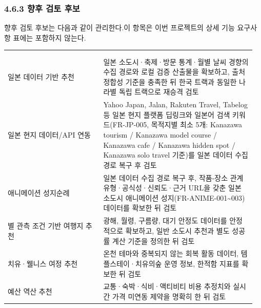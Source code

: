 \documentclass[12pt,a4paper]{article}
\makeatletter
\newcommand{\DocNeedspace}[1]{\par\ifdim\dimexpr\pagegoal-\pagetotal\relax<#1\newpage\fi}
\renewcommand{\arraystretch}{1.35}
\newcommand{\DocTableContinue}[2]{\multicolumn{#1}{@{}l@{}}{\footnotesize\textbf{#2 (계속)}} \\}
\makeatother
\begin{document}
\newpage
\DocNeedspace{5\baselineskip}
\subsubsection*{4.6.3 향후 검토 후보}


\DocNeedspace{3\baselineskip}
향후 검토 후보는 다음과 같이 관리한다.\newline 이 항목은 이번 프로젝트의 상세 기능 요구사항 표에는 포함하지 않는다.


\DocNeedspace{18\baselineskip}
\begin{small}
\setlength{\tabcolsep}{3pt}
\setlength{\extrarowheight}{1pt}
\renewcommand{\arraystretch}{1.42}
\begin{longtable}{@{}>{\centering\arraybackslash}m{0.370\linewidth}>{\RaggedRight\arraybackslash}m{0.594\linewidth}@{}}
\toprule
\multicolumn{1}{>{\centering\arraybackslash}m{0.370\linewidth}}{\textbf{후보}} & \multicolumn{1}{>{\centering\arraybackslash}m{0.594\linewidth}}{\textbf{검토 조건}} \\
\midrule
\endfirsthead
\toprule
\DocTableContinue{2}{4.6.3 향후 검토 후보}
\midrule
\multicolumn{1}{>{\centering\arraybackslash}m{0.370\linewidth}}{\textbf{후보}} & \multicolumn{1}{>{\centering\arraybackslash}m{0.594\linewidth}}{\textbf{검토 조건}} \\
\midrule
\endhead
일본 데이터 기반 추천 & 일본 소도시·축제·방문 통계·월별 날씨 경향의 수집 경로와 로컬 검증 산출물을 확보하고, 출처 정합성 기준을 충족한 뒤 한국 트랙과 동일한 나라별 독립 트랙으로 재승격 검토 \\
일본 현지 데이터/API 연동 & Yahoo Japan, Jalan, Rakuten Travel, Tabelog 등 일본 현지 플랫폼 딥링크와 일본어 검색 키워드(FR-JP-005, 목적지별 최소 5개: Kanazawa tourism / Kanazawa model course / Kanazawa cafe / Kanazawa hidden spot / Kanazawa solo travel 기준)를 일본 데이터 수집 경로 복구 후 검토 \\
애니메이션 성지순례 & 일본 데이터 수집 경로 복구 후, 작품-장소 관계 유형·공식성·신뢰도·근거 URL을 갖춘 일본 소도시 애니메이션 성지(FR-ANIME-001\textasciitilde{}003) 데이터를 확보한 뒤 검토 \\
별 관측 조건 기반 여행지 추천 & 광해, 월령, 구름량, 대기 안정도 데이터를 안정적으로 확보하고, 일반 소도시 추천과 별도 성공률 계산 기준을 정의한 뒤 검토 \\
치유·웰니스 여정 추천 & 온천 테마와 중복되지 않는 회복 활동 데이터, 템플스테이·치유의숲 운영 정보, 한적함 지표를 확보한 뒤 검토 \\
예산 역산 추천 & 교통·숙박·식비·액티비티 비용 추정치와 실시간 가격 미연동 제약을 명확히 한 뒤 검토 \\
\bottomrule
\end{longtable}
\end{small}
\end{document}
